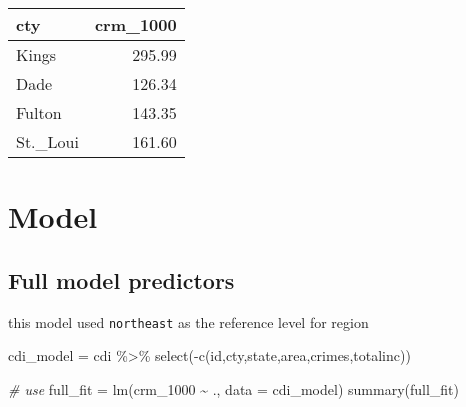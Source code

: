 \documentclass[
]{article}
\newenvironment{Shaded}{\begin{snugshade}}{\end{snugshade}}
\newcommand{\AttributeTok}[1]{\textcolor[rgb]{0.77,0.63,0.00}{#1}}
\newcommand{\CommentTok}[1]{\textcolor[rgb]{0.56,0.35,0.01}{\textit{#1}}}
\newcommand{\FunctionTok}[1]{\textcolor[rgb]{0.00,0.00,0.00}{#1}}
\newcommand{\NormalTok}[1]{#1}
\newcommand{\OtherTok}[1]{\textcolor[rgb]{0.56,0.35,0.01}{#1}}
\newcommand{\SpecialCharTok}[1]{\textcolor[rgb]{0.00,0.00,0.00}{#1}}
\begin{document}
\begin{longtable}[]{@{}lr@{}}
\toprule
cty & crm\_1000 \\
\midrule
\endhead
Kings & 295.99 \\
Dade & 126.34 \\
Fulton & 143.35 \\
St.\_Loui & 161.60 \\
\bottomrule
\end{longtable}

\hypertarget{model}{%
\section{Model}\label{model}}

\hypertarget{full-model-predictors}{%
\subsection{Full model predictors}\label{full-model-predictors}}

this model used \texttt{northeast} as the reference level for region

\begin{Shaded}
\begin{Highlighting}[]
\NormalTok{cdi\_model }\OtherTok{=}\NormalTok{ cdi }\SpecialCharTok{\%\textgreater{}\%} \FunctionTok{select}\NormalTok{(}\SpecialCharTok{{-}}\FunctionTok{c}\NormalTok{(id,cty,state,area,crimes,totalinc))}

\CommentTok{\# use }
\NormalTok{full\_fit }\OtherTok{=} \FunctionTok{lm}\NormalTok{(crm\_1000 }\SpecialCharTok{\textasciitilde{}}\NormalTok{ ., }\AttributeTok{data =}\NormalTok{ cdi\_model)}
\FunctionTok{summary}\NormalTok{(full\_fit)}
\end{Highlighting}
\end{Shaded}
\end{document}
